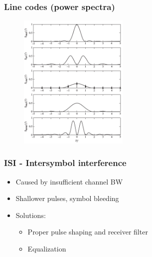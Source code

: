 \documentclass{beamer}
\begin{document}
	\begin{frame}
		\frametitle{Line codes (power spectra)}
		\begin{figure}
			\includegraphics[width=\textwidth,height= 6.5cm,keepaspectratio,center]{lc_spectra.png}
		\end{figure}
	\end{frame}

	\begin{frame}
		\frametitle{ISI - Intersymbol interference}
		\begin{itemize}
			\item Caused by insufficient channel BW
			\item Shallower pulses, symbol bleeding
			\item Solutions:
			\begin{itemize}
				\item Proper pulse shaping and receiver filter
				\item Equalization
			\end{itemize}
		\end{itemize}
	\end{frame}
\end{document}
